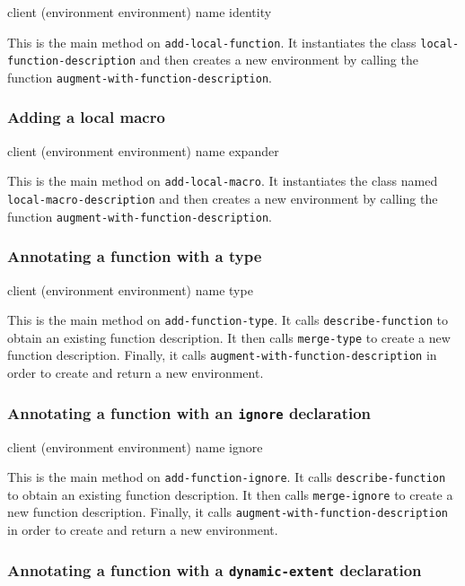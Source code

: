 {\footnotesize
{}
{client
 (environment environment)
 name
 \optional identity}
}

This is the main method on \texttt{add-local-function}.  It
instantiates the class \texttt{local-function-description} and then
creates a new environment by calling the function
\texttt{augment-with-function-description}.

\subsubsection{Adding a local macro}

{\footnotesize
{} {client (environment environment) name expander}
}

This is the main method on \texttt{add-local-macro}.  It instantiates
the class named \texttt{local-macro-description} and then creates a
new environment by calling the function
\texttt{augment-with-function-description}.

\subsubsection{Annotating a function with a type}

{\footnotesize
{}
{client
 (environment environment)
 name
 type}
}

This is the main method on \texttt{add-function-type}.  It
calls \texttt{describe-function} to obtain an existing function
description.  It then calls \texttt{merge-type} to create a new
function description.  Finally, it calls
\texttt{augment-with-function-description} in order to create and
return a new environment.

\subsubsection{Annotating a function with an \texttt{ignore} declaration}

{\footnotesize
{}
{client
 (environment environment)
 name
 ignore}
}

This is the main method on \texttt{add-function-ignore}.  It calls
\texttt{describe-function} to obtain an existing function description.
It then calls \texttt{merge-ignore} to create a new function
description.  Finally, it calls
\texttt{augment-with-function-description} in order to create and
return a new environment.

\subsubsection{Annotating a function with a \texttt{dynamic-extent} declaration}

